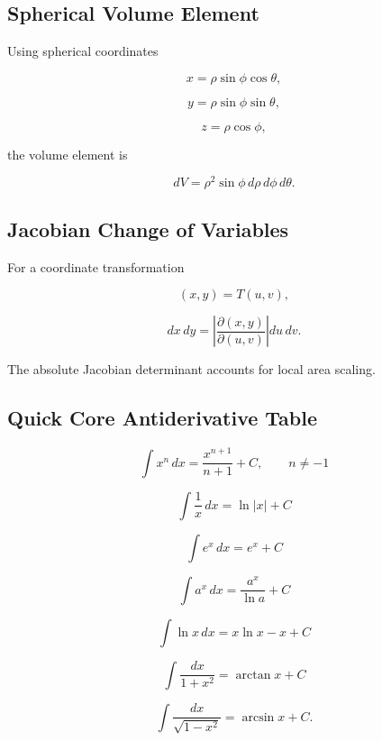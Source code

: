 \subsection{Spherical Volume Element}
\label{subsec:spherical-volume-element}

Using spherical coordinates

\[
x
=
\rho\sin\phi\cos\theta,
\]

\[
y
=
\rho\sin\phi\sin\theta,
\]

\[
z
=
\rho\cos\phi,
\]

the volume element is

\[
\boxed{
dV
=
\rho^2\sin\phi
\,d\rho\,d\phi\,d\theta.
}
\]

\subsection{Jacobian Change of Variables}
\label{subsec:jacobian-change-variables-integral}

For a coordinate transformation

\[
(x,y)
=
T(u,v),
\]

\[
\boxed{
dx\,dy
=
\left|
\frac{
\partial(x,y)
}{
\partial(u,v)
}
\right|
du\,dv.
}
\]

The absolute Jacobian determinant accounts for local area scaling.

\subsection{Quick Core Antiderivative Table}
\label{subsec:quick-core-antiderivative-table}

\[
\boxed{
\int x^n\,dx
=
\frac{x^{n+1}}{n+1}+C,
\qquad
n\neq-1
}
\]

\[
\boxed{
\int\frac1x\,dx
=
\ln|x|+C
}
\]

\[
\boxed{
\int e^x\,dx
=
e^x+C
}
\]

\[
\boxed{
\int a^x\,dx
=
\frac{a^x}{\ln a}+C
}
\]

\[
\boxed{
\int\ln x\,dx
=
x\ln x-x+C
}
\]

\[
\boxed{
\int\frac{dx}{1+x^2}
=
\arctan x+C
}
\]

\[
\boxed{
\int\frac{dx}{\sqrt{1-x^2}}
=
\arcsin x+C.
}
\]

